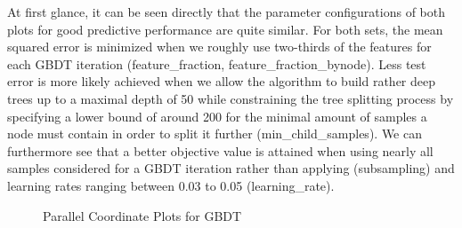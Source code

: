 At first glance, it can be seen directly that the parameter configurations of both plots for good predictive performance are quite similar. For both sets, the mean squared error is minimized when we roughly use two-thirds of the features for each GBDT iteration (feature\_fraction, feature\_fraction\_bynode). Less test error is more likely achieved when we allow the algorithm to build rather deep trees up to a maximal depth of 50 while constraining the tree splitting process by specifying a lower bound of around 200 for the minimal amount of samples a node must contain in order to split it further (min\_child\_samples). We can furthermore see that a better objective value is attained when using nearly all samples considered for a GBDT iteration rather than applying (subsampling) and learning rates ranging between 0.03 to 0.05 (learning\_rate).

\begin{figure}[h]
	\centering
	\caption{Parallel Coordinate Plots for GBDT}
	\label{fig:GBDT_ParallelPlot}
\end{figure}

